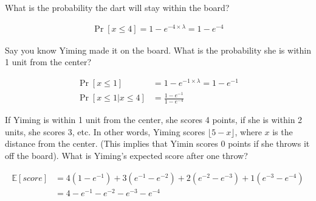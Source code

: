 \documentclass[11pt]{article}
\newcommand{\E}[0]{\mathbb{E}}
\begin{document}
\newpage
{}

\begin{Parts}
    
    \Part What is the probability the dart will stay within the board?

    \begin{Answer}
        \begin{align*}
            \Pr[x \leq 4] = 1 - e^{-4 \times \lambda} = 1 - e^{-4}
        \end{align*}
    \end{Answer}

    \Part Say you know Yiming made it on the board. What is the probability she is within 1 unit from the center?

    \begin{Answer}
        \begin{align*}
            \Pr[x \leq 1]            &= 1 - e^{-1 \times \lambda} = 1 - e^{-1} \\
            \Pr[x \leq 1 | x \leq 4] &= \frac{1 - e^{-1}}{1 - e^{-4}}
        \end{align*}
    \end{Answer}

    \Part If Yiming is within 1 unit from the center, she scores 4 points, if she is within 2 units, she scores 3, etc. In other words, Yiming scores $\lfloor 5 - x\rfloor$, where $x$ is the distance from the center. (This implies that Yimin scores 0 points if she throws it off the board). What is Yiming's expected score after one throw?

    \begin{Answer}
        \begin{align*}
            \E[score] &= 4(1 - e^{-1}) + 3(e^{-1} - e^{-2}) + 2(e^{-2} - e^{-3}) + 1(e^{-3} - e^{-4}) \\
                      &= 4 - e^{-1} - e^{-2} - e^{-3} - e^{-4}
        \end{align*}
    \end{Answer}

\end{Parts}

\newpage
{}
\end{document}
